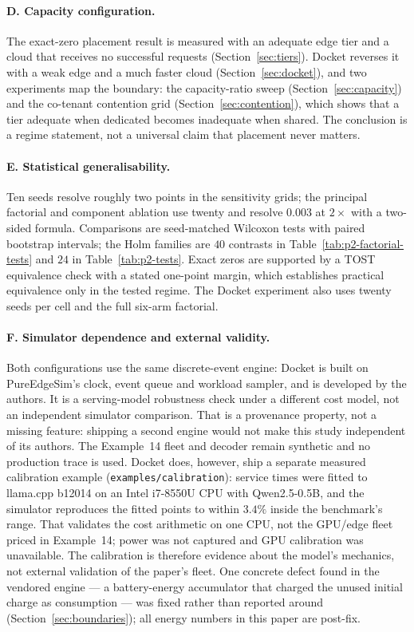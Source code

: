 \documentclass[journal,10pt]{IEEEtran}
\begin{document}
\paragraph{D. Capacity configuration.}
The exact-zero placement result is measured with an adequate edge tier and a
cloud that receives no successful requests (Section~\ref{sec:tiers}). Docket
reverses it with a weak edge and a much faster cloud (Section~\ref{sec:docket}),
and two experiments map the boundary: the capacity-ratio sweep
(Section~\ref{sec:capacity}) and the co-tenant contention grid
(Section~\ref{sec:contention}), which shows that a tier adequate when dedicated
becomes inadequate when shared. The conclusion is a regime statement, not a
universal claim that placement never matters.

\paragraph{E. Statistical generalisability.}
Ten seeds resolve roughly two points in the sensitivity grids; the principal
factorial and component ablation use twenty and resolve $0.003$ at $2\times$
with a two-sided formula. Comparisons are seed-matched Wilcoxon tests with
paired bootstrap intervals; the Holm families are $40$ contrasts in
Table~\ref{tab:p2-factorial-tests} and $24$ in Table~\ref{tab:p2-tests}. Exact
zeros are supported by a TOST equivalence check with a stated one-point margin,
which establishes practical equivalence only in the tested regime. The Docket
experiment also uses twenty seeds per cell and the full six-arm factorial.

\paragraph{F. Simulator dependence and external validity.}
Both configurations use the same discrete-event engine: Docket is built on
PureEdgeSim's clock, event queue and workload sampler, and is developed by the
authors. It is a serving-model robustness check under a different cost model,
not an independent simulator comparison. That is a provenance property, not a
missing feature: shipping a second engine would not make this study independent
of its authors. The Example~14 fleet and decoder remain synthetic and no
production trace is used. Docket does, however, ship a separate measured
calibration example (\texttt{examples/calibration}): service times were fitted to
llama.cpp b12014 on an Intel i7-8550U CPU with Qwen2.5-0.5B, and the simulator
reproduces the fitted points to within $3.4\%$ inside the benchmark's range.
That validates the cost arithmetic on one CPU, not the GPU/edge fleet priced in
Example~14; power was not captured and GPU calibration was unavailable. The
calibration is therefore evidence about the model's mechanics, not external
validation of the paper's fleet. One concrete defect found in the vendored
engine --- a battery-energy accumulator that charged the unused initial charge as
consumption --- was fixed rather than reported around
(Section~\ref{sec:boundaries}); all energy numbers in this paper are post-fix.
\end{document}
